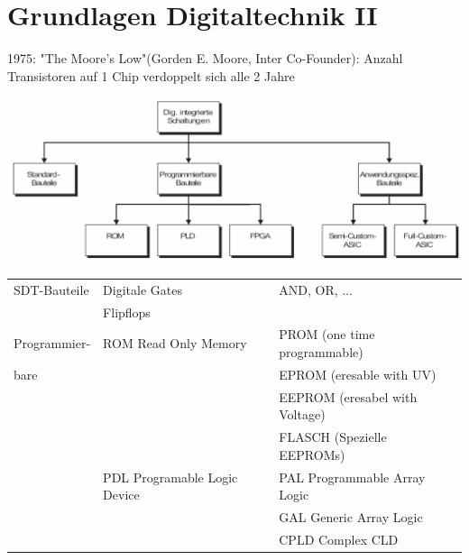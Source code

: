 \section{Grundlagen Digitaltechnik II}

1975: "The Moore's Low"(Gorden E. Moore, Inter Co-Founder): Anzahl Transistoren auf 1 Chip verdoppelt sich alle 2 Jahre\\

\begin{minipage}{0.5\textwidth}
	\includegraphics[width=\textwidth]{./bilder/Klassierung}
\end{minipage}
\begin{minipage}[b]{0.5\textwidth}
	\begin{tabular}{l l l}
		SDT-Bauteile 		& Digitale Gates						& AND, OR, ...\\
							& Flipflops 							& \\
		\hline
		Programmier-	 	& ROM {\tiny Read Only Memory}			& PROM {\tiny(one time programmable)}\\
		bare				&										& EPROM {\tiny(eresable with UV)} \\
							&										& EEPROM {\tiny(eresabel with Voltage)}\\
							&										& FLASCH {\tiny (Spezielle EEPROMs)}\\
							\cline{2-3}
							& PDL {\tiny Programable Logic Device}	& PAL {\tiny Programmable Array Logic}\\
							& 										& GAL {\tiny Generic Array Logic} \\
							&										& CPLD {\tiny Complex CLD} \\
							\cline{2-3}
	\end{tabular}
\end{minipage}

